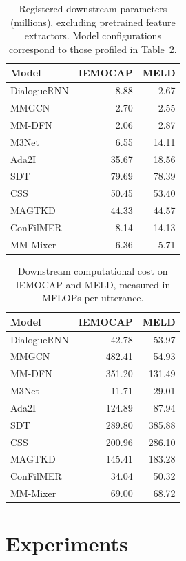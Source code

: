\documentclass[letterpaper]{article} %
\begin{document}
\begin{table}[t]
\centering
\small
\begin{tabular}{lrr}
\toprule
Model & IEMOCAP & MELD \\
\midrule
DialogueRNN & 8.88 & 2.67 \\
MMGCN & 2.70 & 2.55 \\
MM-DFN & 2.06 & 2.87 \\
M3Net & 6.55 & 14.11 \\
Ada2I & 35.67 & 18.56 \\
SDT & 79.69 & 78.39 \\
CSS & 50.45 & 53.40 \\
MAGTKD & 44.33 & 44.57 \\
ConFilMER & 8.14 & 14.13 \\
\midrule
MM-Mixer & 6.36 & 5.71 \\
\bottomrule
\end{tabular}
\caption{Registered downstream parameters (millions), excluding
pretrained feature extractors. Model configurations correspond to
those profiled in Table~\ref{tab:model_flops}.}
\label{tab:model_parameters}
\end{table}

\begin{table}[t]
\centering
\small
\begin{tabular}{lrr}
\toprule
Model & IEMOCAP & MELD \\
\midrule
DialogueRNN & 42.78 & 53.97 \\
MMGCN & 482.41 & 54.93 \\
MM-DFN & 351.20 & 131.49 \\
M3Net & 11.71 & 29.01 \\
Ada2I & 124.89 & 87.94 \\
SDT & 289.80 & 385.88 \\
CSS & 200.96 & 286.10 \\
MAGTKD & 145.41 & 183.28 \\
ConFilMER & 34.04 & 50.32 \\
\midrule
MM-Mixer & 69.00 & 68.72 \\
\bottomrule
\end{tabular}
\caption{Downstream computational cost on IEMOCAP and MELD,
measured in MFLOPs per utterance.}
\label{tab:model_flops}
\end{table}

\section{Experiments}
\end{document}

